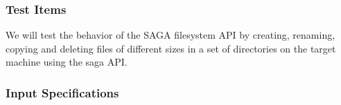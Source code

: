 





\subsubsection{Test Items}

We will test the behavior of the SAGA filesystem API by creating,
renaming, copying and deleting files of different sizes in a set of directories on the
target machine using the saga API. 



\subsubsection{Input Specifications}

